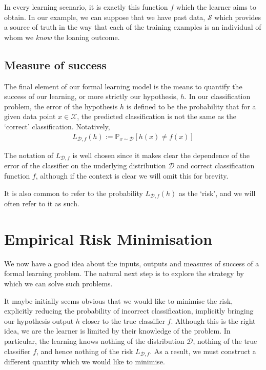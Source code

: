 In every learning scenario, it is exactly this function $ f $ which the learner aims to obtain. In our example, we can suppose that we have past data, $ \mathcal{S} $ which provides a source of truth in the way that each of the training examples is an individual of whom we \textit{know} the loaning outcome.


\subsection{Measure of success}
The final element of our formal learning model is the means to quantify the success of our learning, or more strictly our hypothesis, $ h $. In our classification problem, the error of the hypothesis $ h $ is defined to be the probability that for a given data point $ x \in \mathcal{X} $, the predicted classification is not the same as the `correct' classification. Notatively,
\begin{align*}
	L_{\mathcal{D}, f}( h ) := \mathbb{P}_{x \sim \mathcal{D}}\left[ h ( x ) \neq f ( x ) \right]
\end{align*}

\begin{remark}
	The notation of $ L_{\mathcal{D}, f} $ is well chosen since it makes clear the dependence of the error of the classifier on the underlying distribution $ \mathcal{D} $ and correct classification function $ f $, although if the context is clear we will omit this for brevity.

	It is also common to refer to the probability $ L_{\mathcal{D}, f}( h ) $ as the `risk', and we will often refer to it as such.
\end{remark}

\section{Empirical Risk Minimisation \intermediate}
We now have a good idea about the inputs, outputs and measures of success of a formal learning problem. The natural next step is to explore the strategy by which we can solve such problems.

It maybe initially seems obvious that we would like to minimise the risk, explicitly reducing the probability of incorrect classification, implicitly bringing our hypothesis output $ h $ closer to the true classifier $ f $. Although this is the right idea, we are the learner is limited by their knowledge of the problem. In particular, the learning knows nothing of the distribution $ \mathcal{D} $, nothing of the true classifier $ f $, and hence nothing of the risk $ L_{\mathcal{D}, f} $. As a result, we must construct a different quantity which we would like to minimise.

